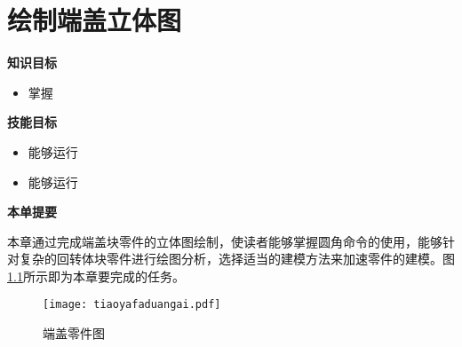 \chapter{绘制端盖立体图}

{\bfseries 知识目标}
\begin{itemize}
\item 掌握
\end{itemize}

{\bfseries 技能目标}
\begin{itemize}
\item 能够运行
\item 能够运行
\end{itemize}

{\bfseries 本单提要}

本章通过完成端盖块零件的立体图绘制，使读者能够掌握圆角命令的使用，能够针对复杂的回转体块零件进行绘图分析，选择适当的建模方法来加速零件的建模。图\ref{fig:tiaoyafaduangai}所示即为本章要完成的任务。
\noindent
\begin{figure}[htbp]
\centering
\texttt{[image: tiaoyafaduangai.pdf]}
\caption{端盖零件图}\label{fig:tiaoyafaduangai}
\end{figure}
\endinput